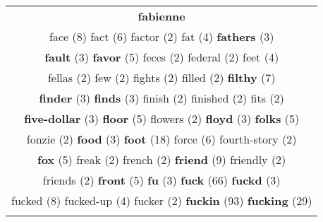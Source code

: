 \documentclass[12pt,a4paper]{article}
\begin{document}
\begin{center}
\begin{longtable}{|c|}
{\bf fabienne}} \footnotesize{(7)}  \\ {\huge \textcolor{Amarelo} {face}} \footnotesize{(8)} {\Large \textcolor{VermEscuro} {fact}} \footnotesize{(6)} {\footnotesize \textcolor{Verde} {factor}} \footnotesize{(2)} {\normalsize \textcolor{VerdeLocao} {fat}} \footnotesize{(4)} {\small \textcolor{Laranja} {\bf fathers}} \footnotesize{(3)}  \\ {\small \textcolor{Laranja} {\bf fault}} \footnotesize{(3)} {\large \textcolor{Roxo} {\bf favor}} \footnotesize{(5)} {\footnotesize \textcolor{Verde} {feces}} \footnotesize{(2)} {\footnotesize \textcolor{Verde} {federal}} \footnotesize{(2)} {\normalsize \textcolor{VerdeLocao} {feet}} \footnotesize{(4)}  \\ {\footnotesize \textcolor{Verde} {fellas}} \footnotesize{(2)} {\footnotesize \textcolor{Verde} {few}} \footnotesize{(2)} {\footnotesize \textcolor{Verde} {fights}} \footnotesize{(2)} {\footnotesize \textcolor{Verde} {filled}} \footnotesize{(2)} {\LARGE \textcolor{Rosa} {\bf filthy}} \footnotesize{(7)}  \\ {\small \textcolor{Laranja} {\bf finder}} \footnotesize{(3)} {\small \textcolor{Laranja} {\bf finds}} \footnotesize{(3)} {\footnotesize \textcolor{Verde} {finish}} \footnotesize{(2)} {\footnotesize \textcolor{Verde} {finished}} \footnotesize{(2)} {\footnotesize \textcolor{Verde} {fits}} \footnotesize{(2)}  \\ {\small \textcolor{Laranja} {\bf five-dollar}} \footnotesize{(3)} {\large \textcolor{Roxo} {\bf floor}} \footnotesize{(5)} {\footnotesize \textcolor{Verde} {flowers}} \footnotesize{(2)} {\small \textcolor{Laranja} {\bf floyd}} \footnotesize{(3)} {\large \textcolor{Roxo} {\bf folks}} \footnotesize{(5)}  \\ {\footnotesize \textcolor{Verde} {fonzie}} \footnotesize{(2)} {\small \textcolor{Laranja} {\bf food}} \footnotesize{(3)} {\Huge \textcolor{AzulEscuro} {\bf foot}} \footnotesize{(18)} {\Large \textcolor{VermEscuro} {force}} \footnotesize{(6)} {\footnotesize \textcolor{Verde} {fourth-story}} \footnotesize{(2)}  \\ {\large \textcolor{Roxo} {\bf fox}} \footnotesize{(5)} {\footnotesize \textcolor{Verde} {freak}} \footnotesize{(2)} {\footnotesize \textcolor{Verde} {french}} \footnotesize{(2)} {\Huge \textcolor{AzulEscuro} {\bf friend}} \footnotesize{(9)} {\footnotesize \textcolor{Verde} {friendly}} \footnotesize{(2)}  \\ {\footnotesize \textcolor{Verde} {friends}} \footnotesize{(2)} {\large \textcolor{Roxo} {\bf front}} \footnotesize{(5)} {\small \textcolor{Laranja} {\bf fu}} \footnotesize{(3)} {\Huge \textcolor{AzulEscuro} {\bf fuck}} \footnotesize{(66)} {\small \textcolor{Laranja} {\bf fuckd}} \footnotesize{(3)}  \\ {\huge \textcolor{Amarelo} {fucked}} \footnotesize{(8)} {\normalsize \textcolor{VerdeLocao} {fucked-up}} \footnotesize{(4)} {\footnotesize \textcolor{Verde} {fucker}} \footnotesize{(2)} {\Huge \textcolor{AzulEscuro} {\bf fuckin}} \footnotesize{(93)} {\Huge \textcolor{AzulEscuro} {\bf fucking}} \footnotesize{(29)}  \\ {\footnotesize \textcolor{Verde} 
\end{longtable}
\end{center}
\end{document}

